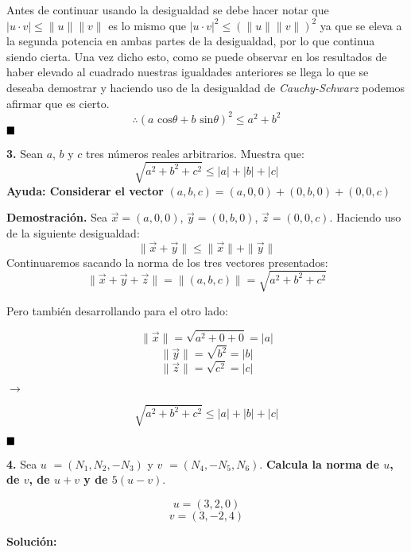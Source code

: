 \documentclass{article}
\begin{document}
Antes de continuar usando la desigualdad se debe hacer notar que $\left|u\cdot v\right| \leq \|u\|\|v\|$ es lo mismo que 
$\left|u\cdot v\right|^2 \leq (\|u\|\|v\|)^2$ ya que se eleva a la segunda potencia en ambas partes de la desigualdad, por lo que 
continua siendo cierta. Una vez dicho esto, como se puede observar en los resultados de haber elevado al cuadrado nuestras igualdades 
anteriores se llega lo que se deseaba demostrar y haciendo uso de la desigualdad de \emph{Cauchy-Schwarz} podemos afirmar que es cierto. 
$$\therefore(a \text{ cos}\theta + b \text{ sin}\theta)^2\leq a^2+b^2$$
$\hfill\blacksquare$
\par 
\textbf{3.} Sean $a$, $b$ y $c$ tres números reales arbitrarios. Muestra que: 
$$\sqrt{a^2+b^2+c^2} \leq \left|a\right|+ \left|b\right|+ \left|c\right|$$
\textbf{Ayuda: Considerar el vector} $(a,b,c) =(a,0,0)+ (0,b,0)+ (0,0,c)$
\vspace{10pt}

\textbf{Demostración.} Sea $\vec{x} = (a, 0, 0)$, $\vec{y} = (0,b,0)$, $\vec{z} = (0, 0, c)$.
Haciendo uso de la siguiente desigualdad: 
$$\|\vec{x}+\vec{y}\| \leq \|\vec{x}\| + \|\vec{y}\|$$
Continuaremos sacando la norma de los tres vectores presentados: 
$$\|\vec{x}+\vec{y}+ \vec{z}\| = \|(a,b,c)\| = \sqrt{a^2+b^2+c^2}$$

Pero también desarrollando para el otro lado: 
\par
\begin{minipage}[c]{0.5cm}
    $$\|\vec{x}\| = \sqrt{a^2+0+0} = \left|a\right|$$
    $$\|\vec{y}\| = \sqrt{b^2} = \left|b\right|$$
    $$\|\vec{z}\| = \sqrt{c^2} = \left|c\right|$$
\end{minipage}\hspace*{4cm}
$\rightarrow$\hspace*{0.5cm}
\begin{minipage}[c]{0.5cm}
    $$\sqrt{a^2+b^2+c^2} \leq \left|a\right|+ \left|b\right|+ \left|c\right|$$
\end{minipage}
\vspace{10pt}

$\hfill\blacksquare$


\textbf{4.} Sea \textbf{$u$} $= (N_1, N_2, -N_3)$ y \textbf{$v$} $= (N_4, -N_5, N_6)$. \textbf{Calcula la norma de $u$, de $v$, de $u+v$ 
y de $5(u-v)$}. 

$$u = (3,2,0)$$
$$v=(3, -2, 4)$$

\textbf{Solución:}
\vspace{10pt}
\end{document}
